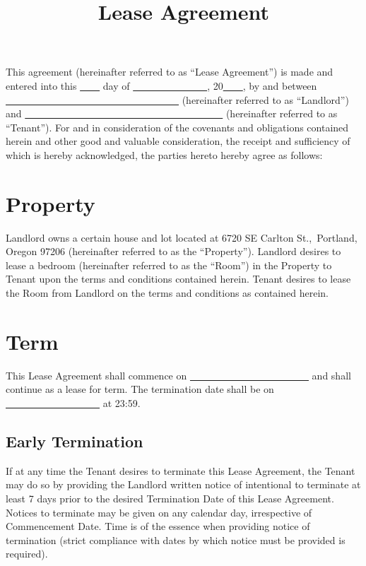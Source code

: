 \documentclass{amsart}
\title{Lease Agreement}
\begin{document}
\maketitle
This agreement (hereinafter referred to as ``Lease Agreement'') is made and
entered into this \underline{\ \ \ \ } day of \underline{\ \ \ \ \ \ \ \ \ \ \ \
\ \ \ }, 20\underline{\ \ \ \ }, by and between \underline{\ \ \ \ \ \ \ \ \ \ \
\ \ \ \ \ \ \ \ \ \ \ \ \ \ \ \ \ \ \ \ \ \ \ \ } (hereinafter referred to as
``Landlord'') and \underline{\ \ \ \ \ \ \ \ \ \ \ \ \ \ \ \ \ \ \ \ \ \ \ \ \ \
\ \ \ \ \ \ \ \ \ \ \ \ \ \ } (hereinafter referred to as ``Tenant'').
For and in consideration of the covenants and obligations contained herein and
other good and valuable consideration, the receipt and sufficiency of which is
hereby acknowledged, the parties hereto hereby agree as follows:
\section{Property}
Landlord owns a certain house and lot located at 6720 SE Carlton St.,\ Portland,
Oregon 97206 (hereinafter referred to as the ``Property''). Landlord desires to
lease a bedroom (hereinafter referred to as the ``Room'') in the Property to
Tenant upon the terms and conditions contained herein. Tenant desires to lease
the Room from Landlord on the terms and conditions as contained herein.
\section{Term}
\label{sec:Term}
This Lease Agreement shall commence on
\underline{\ \ \ \ \ \ \ \ \ \ \ \ \ \ \ \ \ \ \ \ \ \ \ \ } and shall continue
as a lease for term. The termination date shall be on
\underline{\ \ \ \ \ \ \ \ \ \ \ \ \ \ \ \ \ \ \ } at 23:59.
\subsection{Early Termination}
\label{sec:early-termination}
If at any time the Tenant desires to terminate this Lease Agreement, the Tenant
may do so by providing the Landlord written notice of intentional to terminate
at least 7 days prior to the desired Termination Date of this Lease
Agreement. Notices to terminate may be given on any calendar day, irrespective
of Commencement Date. Time is of the essence when providing notice of
termination (strict compliance with dates by which notice must be provided is
required).
\end{document}
